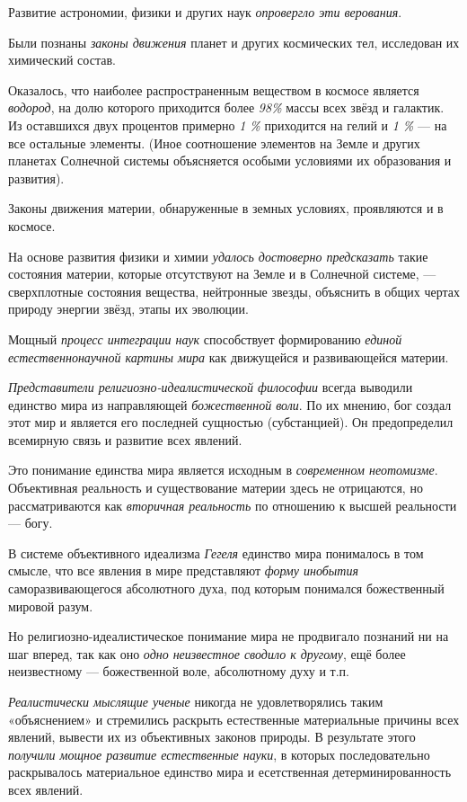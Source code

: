 \documentclass[a4paper,14pt,russian]{extreport}
\begin{document}
Развитие астрономии, физики и других наук \emph{опровергло эти верования}.

Были познаны \emph{законы движения} планет и других космических тел, исследован их химический состав.

Оказалось, что наиболее распространенным веществом в космосе является \emph{водород}, на долю которого приходится более \emph{98\%} массы всех звёзд и галактик. Из оставшихся двух процентов примерно \emph{1 \%} приходится на гелий и \emph{1 \%} --- на все остальные элементы. (Иное соотношение элементов на Земле и других планетах Солнечной системы объясняется особыми условиями их образования и развития).

Законы движения материи, обнаруженные в земных условиях, проявляются и в космосе.

На основе развития физики и химии \emph{удалось достоверно предсказать} такие состояния материи, которые отсутствуют на Земле и в Солнечной системе, --- сверхплотные состояния вещества, нейтронные звезды, объяснить в общих чертах природу энергии звёзд, этапы их эволюции.

Мощный \emph{процесс интеграции наук} способствует формированию \emph{единой естественнонаучной картины мира} как движущейся и развивающейся материи.

\emph{Представители религиозно-идеалистической философии} всегда выводили единство мира из направляющей \emph{божественной воли}. По их мнению, бог создал этот мир и является его последней сущностью (субстанцией). Он предопределил всемирную связь и развитие всех явлений.

Это понимание единства мира является исходным в \emph{современном неотомизме}. Объективная реальность и существование материи здесь не отрицаются, но рассматриваются как \emph{вторичная реальность} по отношению к высшей реальности --- богу.

В системе объективного идеализма \emph{Гегеля} единство мира понималось в том смысле, что все явления в мире представляют \emph{форму инобытия} саморазвивающегося абсолютного духа, под которым понимался божественный мировой разум.

Но религиозно-идеалистическое понимание мира не продвигало познаний ни на шаг вперед, так как оно \emph{одно неизвестное сводило к другому}, ещё более неизвестному --- божественной воле, абсолютному духу и т.п.

\emph{Реалистически мыслящие ученые} никогда не удовлетворялись таким «объяснением» и стремились раскрыть естественные материальные причины всех явлений, вывести их из объективных законов природы. В результате этого \emph{получили мощное развитие естественные науки}, в которых последовательно раскрывалось материальное единство мира и есетственная детерминированность всех явлений.
\end{document}
